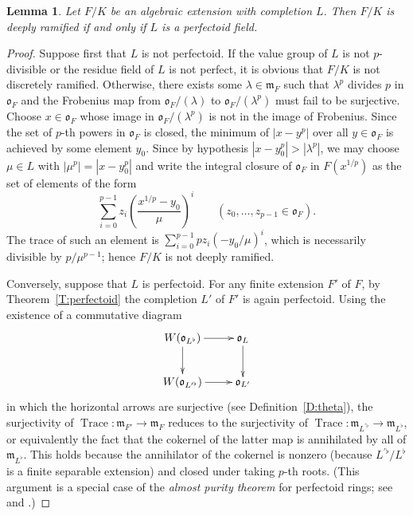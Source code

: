 \documentclass[12pt]{amsart}
\newtheorem{lemma}[theorem]{Lemma}
\theoremstyle{definition}
\numberwithin{equation}{theorem}
\newcommand{\frakm}{\mathfrak{m}}
\newcommand{\frako}{\mathfrak{o}}
\DeclareMathOperator{\Trace}{Trace}
\begin{document}
\begin{lemma} \label{L:deeply ramified is perfectoid}
Let $F/K$ be an algebraic extension with completion $L$. Then $F/K$ is deeply ramified if and only if $L$ is a perfectoid field.
\end{lemma}
\begin{proof}
Suppose first that $L$ is not perfectoid. If the value group of $L$ is not $p$-divisible or the residue field of $L$ is not perfect, it is obvious that $F/K$ is not discretely ramified. Otherwise, there exists some $\lambda \in \frakm_F$ such that $\lambda^p$ divides $p$ in $\frako_F$ and
the Frobenius map from $\frako_F/(\lambda)$ to $\frako_F/(\lambda^p)$ must fail to be surjective.
Choose $x \in \frako_F$ whose image in $\frako_F/(\lambda^p)$ is not in the image of Frobenius. Since the set of $p$-th powers in $\frako_F$ is closed,
the minimum of $\left| x - y^p \right|$ over all $y \in \frako_F$ is achieved by some element $y_0$. 
Since by hypothesis $\left| x - y_0^p \right| > \left| \lambda^p \right|$, 
we may choose $\mu \in L$ with $\left| \mu^p \right| = \left| x - y_0^p \right|$
and write the integral closure of $\frako_F$ in $F(x^{1/p})$ as the set of elements of the form
\[
\sum_{i=0}^{p-1} z_i \left( \frac{x^{1/p} - y_0}{\mu} \right)^{i} 
\qquad (z_0,\dots,z_{p-1} \in \frako_F).
\]
The trace of such an element is $\sum_{i=0}^{p-1} pz_i (-y_0/\mu)^i$, which is necessarily divisible by $p/\mu^{p-1}$; hence $F/K$ is not deeply ramified.

Conversely, suppose that $L$ is perfectoid.
For any finite extension $F'$ of $F$, by Theorem~\ref{T:perfectoid}
the completion $L'$ of $F'$ is again perfectoid. 
Using the existence of a commutative diagram
\[
\xymatrix{
W(\frako_{L^\flat}) \ar[r] \ar[d] & \frako_{L} \ar[d] \\
W(\frako_{L^{\prime \flat}}) \ar[r] & \frako_{L'} 
}
\]
in which the horizontal arrows are surjective (see Definition~\ref{D:theta}), the surjectivity
of $\Trace: \frakm_{F'} \to \frakm_{F}$ reduces to the surjectivity of
$\Trace: \frakm_{L^{\prime \flat}} \to \frakm_{L^{\flat}}$,
or equivalently the fact that the cokernel of the latter map
is annihilated by all of $\frakm_{L^{\flat}}$.
This holds because the annihilator of the cokernel is nonzero
(because $L^{\prime \flat}/L^{\flat}$ is a finite separable extension)
and closed under taking $p$-th roots.
(This argument is a special case of the \emph{almost purity theorem} for perfectoid rings;
see \cite[Theorem~5.5.9]{kedlaya-liu1} and \cite[Theorem~7.9]{scholze1}.)
\end{proof}
\end{document}
